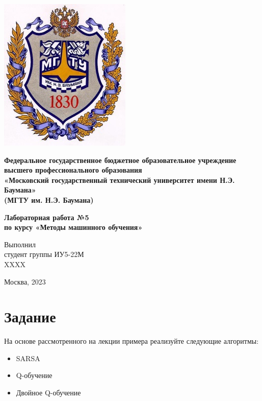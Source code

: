 \documentclass[a4paper]{article}
\begin{document}
  \fontsize{14}{16}\selectfont

  \begin{titlepage}
    \begin{minipage}{0.2\textwidth}
      \includegraphics[scale=0.4]{logo}
    \end{minipage}
    \begin{minipage}{0.7\textwidth}\centering
      \fontsize{10}{12}\selectfont
      \textbf{
        Федеральное государственное бюджетное образовательное учреждение \\
        высшего профессионального образования \\
        «Московский государственный технический университет имени Н.Э. Баумана» \\
        (МГТУ им. Н.Э. Баумана)
      }
    \end{minipage}

    \vspace{5cm}
    \centering
    \fontsize{16}{20}\textbf{
      Лабораторная работа №5 \\
      по курсу «Методы машинного обучения» \\
    }

    \vspace{5cm}
    \begin{flushright}
    Выполнил \\
    студент группы ИУ5-22М \\
    XXXX \\
    \end{flushright}
    \vspace*{\fill}
    Москва, 2023
  \end{titlepage}

  \justifying
  \setlength{\parindent}{1.25cm}

  \section{Задание}
  На основе рассмотренного на лекции примера реализуйте следующие алгоритмы:
  \begin{itemize}
    \item SARSA
    \item Q-обучение
    \item Двойное Q-обучение
  \end{itemize}
\end{document}
